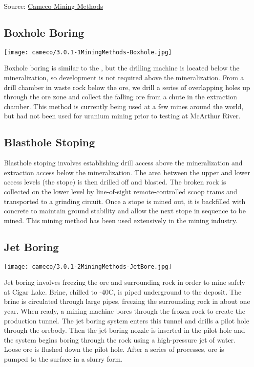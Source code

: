 Source: \href{https://www.cameco.com/businesses/mining-methods}{Cameco Mining Methods}

\subsection*{Boxhole Boring}
\label{ssec_boxbore}
\texttt{[image: cameco/3.0.1-1MiningMethods-Boxhole.jpg]}

Boxhole boring is similar to the , but the drilling machine is located below the mineralization, so development is not required above the mineralization. From a drill chamber in waste rock below the ore, we drill a series of overlapping holes up through the ore zone and collect the falling ore from a chute in the extraction chamber. This method is currently being used at a few mines around the world, but had not been used for uranium mining prior to testing at McArthur River.
\subsection*{Blasthole Stoping}


Blasthole stoping involves establishing drill access above the mineralization and extraction access below the mineralization. The area between the upper and lower access levels (the stope) is then drilled off and blasted. The broken rock is collected on the lower level by line-of-sight remote-controlled scoop trams and transported to a grinding circuit. Once a stope is mined out, it is backfilled with concrete to maintain ground stability and allow the next stope in sequence to be mined. This mining method has been used extensively in the mining industry.
\subsection*{Jet Boring}
\label{ssec_jetbore}
\texttt{[image: cameco/3.0.1-2MiningMethods-JetBore.jpg]}

Jet boring involves freezing the ore and surrounding rock in order to mine safely at Cigar Lake. Brine, chilled to -40C, is piped underground to the deposit. The brine is circulated through large pipes, freezing the surrounding rock in about one year. When ready, a mining machine bores through the frozen rock to create the production tunnel. The jet boring system enters this tunnel and drills a pilot hole through the orebody. Then the jet boring nozzle is inserted in the pilot hole and the system begins boring through the rock using a high-pressure jet of water. Loose ore is flushed down the pilot hole. After a series of processes, ore is pumped to the surface in a slurry form.


